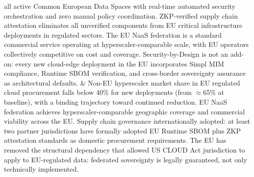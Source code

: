 \begin{landscape}
\begin{longtable}
all active Common European Data Spaces with real-time automated security
orchestration and zero manual policy coordination. ZKP-verified supply
chain attestation eliminates all unverified components from EU critical
infrastructure deployments in regulated sectors. The EU NaaS federation
is a standard commercial service operating at hyperscaler-comparable
scale, with EU operators collectively competitive on cost and coverage.
Security-by-Design is not an add-on: every new cloud-edge deployment
in the EU incorporates Simpl MIM compliance, Runtime SBOM verification,
and cross-border sovereignty assurance as architectural defaults.
&
Non-EU hyperscaler market share in EU regulated cloud procurement
falls below 40\% for new deployments (from $\approx$65\% at baseline),
with a binding trajectory toward continued reduction. EU NaaS
federation achieves hyperscaler-comparable geographic coverage and
commercial viability across the EU. Supply chain governance
internationally adopted: at least two partner jurisdictions have
formally adopted EU Runtime SBOM plus ZKP attestation standards as
domestic procurement requirements. The EU has removed the structural
dependency that allowed US CLOUD Act jurisdiction to apply to
EU-regulated data: federated sovereignty is legally guaranteed, not
only technically implemented.
\\
\hline

\end{longtable}
\end{landscape}



